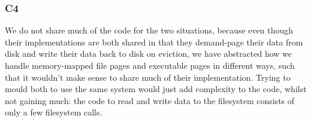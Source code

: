 \documentclass[a4wide, 11pt]{article}
\begin{document}
\subsubsection{C4}

We do not share much of the code for the two situations, because even though their implementations are both shared in that they demand-page their data from disk and write their data back to disk on eviction, we have abstracted how we handle memory-mapped file pages and executable pages in different ways, such that it wouldn't make sense to share much of their implementation. Trying to mould both to use the same system would just add complexity to the code, whilst not gaining much: the code to read and write data to the filesystem consists of only a few filesystem calls.
\end{document}
